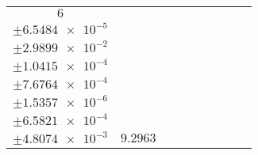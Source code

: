 \documentclass[8pt]{article}
\begin{document}
\begin{longtable}[l]{c c c c c c c c c}
$\num{6}$ & \begin{tabular}[c]{@{}c@{}}$\num{0.12518}$ \\ $\pm\num{6.5484e-5}$\end{tabular} & \begin{tabular}[c]{@{}c@{}}$\num{8.1265e-2}$ \\ $\pm\num{2.9899e-2}$\end{tabular} & \begin{tabular}[c]{@{}c@{}}$\num{6.6487}$ \\ $\pm\num{1.0415e-4}$\end{tabular} & \begin{tabular}[c]{@{}c@{}}$\num{951.34}$ \\ $\pm\num{7.6764e-4}$\end{tabular} & \begin{tabular}[c]{@{}c@{}}$\num{1.9032}$ \\ $\pm\num{1.5357e-6}$\end{tabular} & \begin{tabular}[c]{@{}c@{}}$\num{1.1896}$ \\ $\pm\num{6.5821e-4}$\end{tabular} & \begin{tabular}[c]{@{}c@{}}$\num{4.2412}$ \\ $\pm\num{4.8074e-3}$\end{tabular} & $\num{9.2963}$\\
\bottomrule
\end{longtable}
\end{document}
